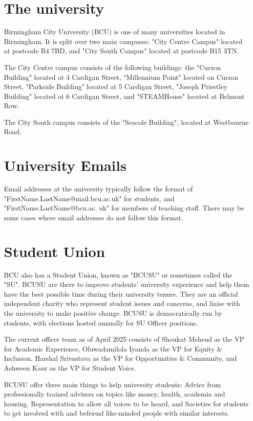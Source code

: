 \documentclass{article}
\begin{document}
\section{The university}
Birmingham City University (BCU) is one of many universities located in Birmingham. It is split over two main campuses:
"City Centre Campus" located at postcode B4 7BD, and "City South Campus" located at postcode B15 3TN.

The City Centre campus consists of the following buildings: the "Curzon Building" located at 4 Cardigan Street,
"Millennium Point" located on Curzon Street, "Parkside Building" located at 5 Cardigan Street, "Joseph Priestley Building"
located at 6 Cardigan Street, and "STEAMHouse" located at Belmont Row.

The City South campus consists of the "Seacole Building", located at Westbourne Road.

\section{University Emails}
Email addresses at the university typically follow the format of "FirstName.LastName@mail.bcu.ac.uk" for students, and "FirstName.LastName@bcu.ac.
uk" for members of teaching staff. There may be some cases where email addresses do not follow this format.

\section{Student Union}
BCU also has a Student Union, known as "BCUSU" or sometimes called the "SU". BCUSU are there to improve students' university experience and help them 
have the best possible time during their university tenure. They are an official independent charity who represent student 
issues and concerns, and liaise with the university to make positive change. BCUSU is democratically run by students, with elections 
hosted annually for SU Officer positions.

The current officer team as of April 2025 consists of Shoukat Mehsud as the VP for Academic Experience, Oluwadamilola Iyanda as the VP for Equity \& 
Inclusion, Harshal Srivastava as the VP for Opportunities \& Community, and Ashween Kaur as the VP for Student Voice. 

BCUSU offer three main things to help university students: Advice from professionally trained advisers on topics like money, health, academia 
and housing. Representation to allow all voices to be heard, and Societies for students to get involved with and befriend like-minded people 
with similar interests.
\end{document}
